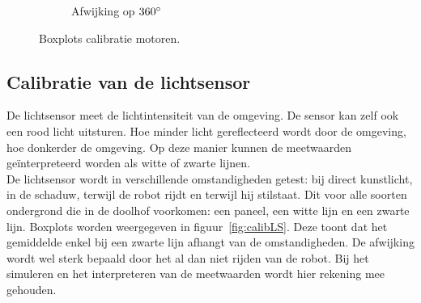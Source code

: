 \documentclass[tt3]{penoverslag}
\begin{document}
\begin{figure}
\begin{subfigure}[h]{0.32\textwidth}
                \caption{Afwijking op $360 \degree$}
        \end{subfigure}
 \caption{Boxplots calibratie motoren.}
\label{fig:calibM}
\end{figure}


\subsection{Calibratie van de lichtsensor} %
\label{ssec:calibLS}
De lichtsensor meet de lichtintensiteit van de omgeving. De sensor kan zelf ook een rood licht uitsturen. Hoe minder licht gereflecteerd wordt door de omgeving, hoe donkerder de omgeving. Op deze manier kunnen de meetwaarden ge\"interpreteerd worden als witte of zwarte lijnen.\\
De lichtsensor wordt in verschillende omstandigheden getest: bij direct kunstlicht, in de schaduw, terwijl de robot rijdt en terwijl hij stilstaat. Dit voor alle soorten ondergrond die in de doolhof voorkomen: een paneel, een witte lijn en een zwarte lijn. Boxplots worden weergegeven in figuur~\ref{fig:calibLS}. Deze toont dat het gemiddelde enkel bij een zwarte lijn afhangt van de omstandigheden. De afwijking wordt wel sterk bepaald door het al dan niet rijden van de robot. Bij het simuleren en het interpreteren van de meetwaarden wordt hier rekening mee gehouden.
\end{document}
